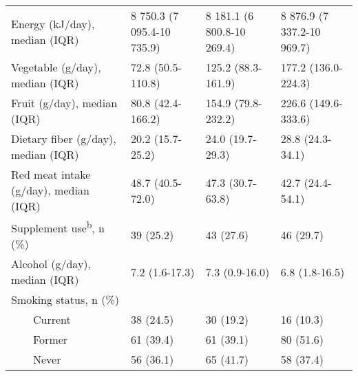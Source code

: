 \begin{table}
\begin{adjustbox}{width=\textwidth}
\begin{tabular}{L{4.8cm}C{3.5cm}C{3.5cm}C{3.5cm}}
Energy (kJ/day), median (IQR) & 8 750.3 (7 095.4-10 735.9) & 8 181.1 (6 800.8-10 269.4) & 8 876.9 (7 337.2-10 969.7)\\
Vegetable (g/day), median (IQR) & 72.8 (50.5-110.8) & 125.2 (88.3-161.9) & 177.2 (136.0-224.3)\\
Fruit (g/day), median (IQR) & 80.8 (42.4-166.2) & 154.9 (79.8-232.2) & 226.6 (149.6-333.6)\\
Dietary fiber (g/day), median (IQR) & 20.2 (15.7-25.2) & 24.0 (19.7-29.3) & 28.8 (24.3-34.1)\\
Red meat intake (g/day), median (IQR) & 48.7 (40.5-72.0) & 47.3 (30.7-63.8) & 42.7 (24.4-54.1)\\
{Supplement use}\textsuperscript{b}{, n (\%)} & 39 (25.2) & 43 (27.6) & 46 (29.7)\\
 Alcohol (g/day), median (IQR) & 7.2 (1.6-17.3) & 7.3 (0.9-16.0) & 6.8 (1.8-16.5)\\
 Smoking status, n (\%) & ~ & ~ & ~ \\
 \ \ \ \ Current & 38 (24.5) & 30 (19.2) & 16 (10.3)\\
 \ \ \ \ Former & 61 (39.4) & 61 (39.1) & 80 (51.6)\\
 \ \ \ \ Never & 56 (36.1) & 65 (41.7) & 58 (37.4)\\
\hline
\end{tabular}
\end{adjustbox}
\end{table}

